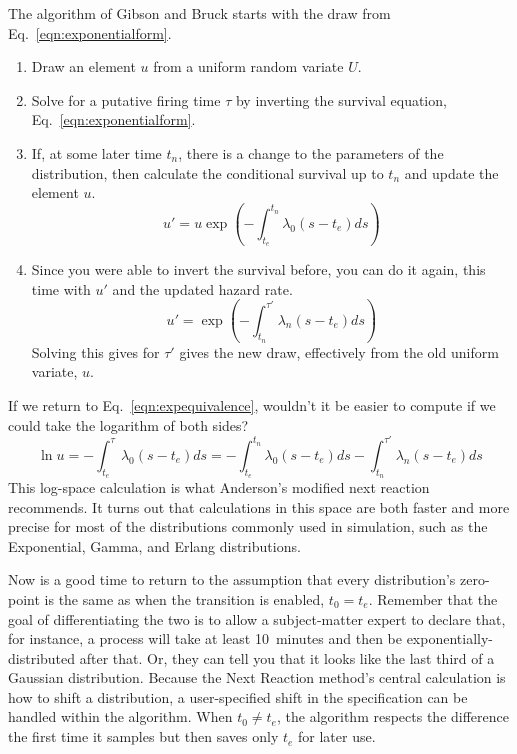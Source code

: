 \documentclass{article}
\begin{document}
The algorithm of Gibson and Bruck starts with the draw from Eq.~\ref{eqn:exponentialform}.
\begin{enumerate}
	\item Draw an element $u$ from a uniform random variate $U$.

	\item Solve for a putative firing time $\tau$ by inverting the survival equation, Eq.~\ref{eqn:exponentialform}.

	\item If, at some later time $t_n$, there is a change to the parameters of the distribution, then calculate the conditional survival up to $t_n$ and update the element $u$.
	\begin{equation}
		u'=u\exp\left(-\int_{t_e}^{t_n}\lambda_0(s-t_e)ds\right)
	\end{equation}

	\item Since you were able to invert the survival before, you can do it again, this time with $u'$ and the updated hazard rate.
	\begin{equation}
		u'=\exp\left(-\int_{t_n}^{\tau'}\lambda_{n}(s-t_e)ds\right)
	\end{equation}
	Solving this gives for $\tau'$ gives the new draw, effectively from the old uniform variate, $u$.
\end{enumerate}

If we return to Eq.~\ref{eqn:expequivalence}, wouldn't it be easier to compute if we could take the logarithm of both sides?
\begin{equation}
	\ln u=-\int_{t_e}^{\tau}\lambda_0(s-t_e)ds = -\int_{t_e}^{t_n}\lambda_0(s-t_e)ds - \int_{t_n}^{\tau'}\lambda_{n}(s-t_e)ds\label{eqn:logequivalence}
\end{equation}
This log-space calculation is what Anderson's modified next reaction recommends. It turns out that calculations in this space are both faster and more precise for most of the distributions commonly used in simulation, such as the Exponential, Gamma, and Erlang distributions.

Now is a good time to return to the assumption that every distribution's zero-point is the same as when the transition is enabled, $t_0=t_e$. Remember that the goal of differentiating the two is to allow a subject-matter expert to declare that, for instance, a process will take at least 10~minutes and then be exponentially-distributed after that. Or, they can tell you that it looks like the last third of a Gaussian distribution. Because the Next Reaction method's central calculation is how to shift a distribution, a user-specified shift in the specification can be handled within the algorithm. When $t_0\ne t_e$, the algorithm respects the difference the first time it samples but then saves only $t_e$ for later use.
\end{document}
